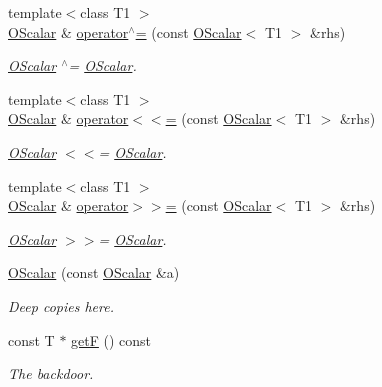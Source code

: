 \begin{DoxyCompactItemize}
{\footnotesize template$<$class T1 $>$ }\\\mbox{\hyperlink{classENSEM_1_1OScalar}{O\+Scalar}} \& \mbox{\hyperlink{classENSEM_1_1OScalar_af66decef8e6be220193ad1292a927e2f}{operator$^\wedge$=}} (const \mbox{\hyperlink{classENSEM_1_1OScalar}{O\+Scalar}}$<$ T1 $>$ \&rhs)
\begin{DoxyCompactList}\small\item\em \mbox{\hyperlink{classENSEM_1_1OScalar}{O\+Scalar}} $^\wedge$= \mbox{\hyperlink{classENSEM_1_1OScalar}{O\+Scalar}}. \end{DoxyCompactList}\item 
{\footnotesize template$<$class T1 $>$ }\\\mbox{\hyperlink{classENSEM_1_1OScalar}{O\+Scalar}} \& \mbox{\hyperlink{classENSEM_1_1OScalar_a93607b92c63ae779d9d3ed131df3f449}{operator$<$$<$=}} (const \mbox{\hyperlink{classENSEM_1_1OScalar}{O\+Scalar}}$<$ T1 $>$ \&rhs)
\begin{DoxyCompactList}\small\item\em \mbox{\hyperlink{classENSEM_1_1OScalar}{O\+Scalar}} $<$$<$= \mbox{\hyperlink{classENSEM_1_1OScalar}{O\+Scalar}}. \end{DoxyCompactList}\item 
{\footnotesize template$<$class T1 $>$ }\\\mbox{\hyperlink{classENSEM_1_1OScalar}{O\+Scalar}} \& \mbox{\hyperlink{classENSEM_1_1OScalar_a38ab5a0779184c6ca5a1b3211e2e38ca}{operator$>$$>$=}} (const \mbox{\hyperlink{classENSEM_1_1OScalar}{O\+Scalar}}$<$ T1 $>$ \&rhs)
\begin{DoxyCompactList}\small\item\em \mbox{\hyperlink{classENSEM_1_1OScalar}{O\+Scalar}} $>$$>$= \mbox{\hyperlink{classENSEM_1_1OScalar}{O\+Scalar}}. \end{DoxyCompactList}\item 
\mbox{\hyperlink{classENSEM_1_1OScalar_a4e394f0291247b014b9b75354e79ae6a}{O\+Scalar}} (const \mbox{\hyperlink{classENSEM_1_1OScalar}{O\+Scalar}} \&a)
\begin{DoxyCompactList}\small\item\em Deep copies here. \end{DoxyCompactList}\item 
const T $\ast$ \mbox{\hyperlink{classENSEM_1_1OScalar_a8e87e97e45239d934b0d141dcf9b92d7}{getF}} () const
\begin{DoxyCompactList}\small\item\em The backdoor. \end{DoxyCompactList}\item 

\end{DoxyCompactItemize}
